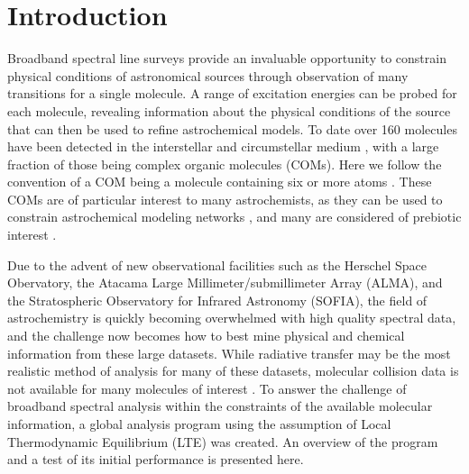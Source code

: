 \section{Introduction}
Broadband spectral line surveys provide an invaluable opportunity to constrain physical conditions of astronomical sources through observation of many transitions for a single molecule.  A range of excitation energies can be probed for each molecule, revealing information about the physical conditions of the source that can then be used to refine astrochemical models.  To date over 160 molecules have been detected in the interstellar and circumstellar medium \citep{Muller_2005}, with a large fraction of those being complex organic molecules (COMs). Here we follow the convention of a COM being a molecule containing six or more atoms \citep{Herbst_2009}. These COMs are of particular interest to many astrochemists, as they can be used to constrain astrochemical modeling networks \citep{Garrod_2008, Laas_2011}, and many are considered of prebiotic interest \citep{Carroll_2010}.

Due to the advent of new observational facilities such as the Herschel Space Obervatory, the Atacama Large Millimeter/submillimeter Array (ALMA), and the Stratospheric Observatory for Infrared Astronomy (SOFIA), the field of astrochemistry is quickly becoming overwhelmed with high quality spectral data, and the challenge now becomes how to best mine physical and chemical information from these large datasets.  While radiative transfer may be the most realistic method of analysis for many of these datasets, molecular collision data is not available for many molecules of interest \citep{vanderTak_2007}.  To answer the challenge of broadband spectral analysis within the constraints of the available molecular information, a global analysis program using the assumption of Local Thermodynamic Equilibrium (LTE) was created.  An overview of the program and a test of its initial performance is presented here.

